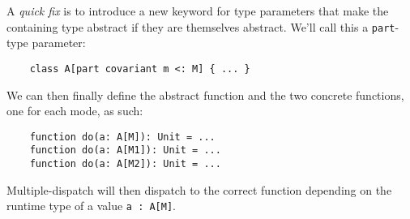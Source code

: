 A \textit{quick fix} is to introduce a new keyword for type parameters that make the containing type abstract if they are themselves abstract. We'll call this a \texttt{part}-type parameter:

\begin{lstlisting}
    class A[part covariant m <: M] { ... }
\end{lstlisting}

We can then finally define the abstract function and the two concrete functions, one for each mode, as such:

\begin{lstlisting}
    function do(a: A[M]): Unit = ...
    function do(a: A[M1]): Unit = ...
    function do(a: A[M2]): Unit = ...
\end{lstlisting}

Multiple-dispatch will then dispatch to the correct function depending on the runtime type of a value \texttt{a : A[M]}.



